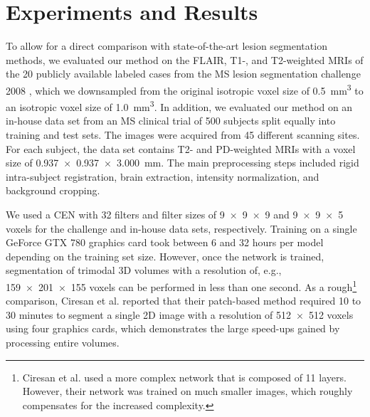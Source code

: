 \section{Experiments and Results}


To allow for a direct comparison with state-of-the-art lesion segmentation
methods, we evaluated our method on the FLAIR, T1-, and T2-weighted MRIs of the
20 publicly available labeled cases from the MS lesion segmentation challenge
2008 \cite{styner20083d}, which we downsampled from the original isotropic voxel
size of \SI{0.5}{\cubic\milli\metre} to an isotropic voxel size of
\SI{1.0}{\cubic\milli\metre}. In addition, we evaluated our method on an
in-house data set from an MS clinical trial of 500 subjects split equally into
training and test sets. The images were acquired from 45 different scanning
sites. For each subject, the data set contains T2- and PD-weighted MRIs with a
voxel size of \SI{0.937x0.937x3.000}{\milli\metre}. The main preprocessing steps
included rigid intra-subject registration, brain extraction, intensity
normalization, and background cropping.

We used a CEN with 32 filters and filter sizes of \num{9x9x9} and \num{9x9x5}
voxels for the challenge and in-house data sets, respectively. Training on a
single GeForce GTX 780 graphics card took between 6 and 32 hours per model
depending on the training set size. However, once the network is trained,
segmentation of trimodal 3D volumes with a resolution of, e.g.,
\num{159x201x155} voxels can be performed in less than one second. As a
rough\footnote{Ciresan et al. used a more complex network that is composed of 11
layers. However, their network was trained on much smaller images, which roughly
compensates for the increased complexity.} comparison, Ciresan et al.
\cite{Ciresan2012} reported that their patch-based method required 10 to 30
minutes to segment a single 2D image with a resolution of \num{512x512} voxels
using four graphics cards, which demonstrates the large speed-ups gained by
processing entire volumes.

